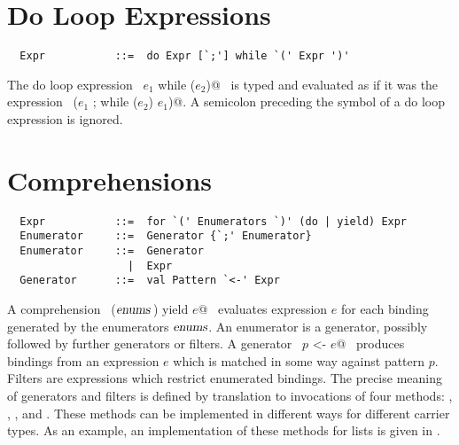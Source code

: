 \documentclass[a4paper,12pt,twoside,titlepage]{book}
\newcommand{\enums}{\mbox{\sl enums}}
\begin{document}
\section{Do Loop Expressions}

\syntax\begin{lstlisting}
  Expr           ::=  do Expr [`;'] while `(' Expr ')'
\end{lstlisting}

The do loop expression ~\lstinline@do $e_1$ while ($e_2$)@~ is typed and
evaluated as if it was the expression ~\lstinline@($e_1$ ; while ($e_2$) $e_1$)@.
A semicolon preceding the  symbol of a do loop expression is ignored.

\section{Comprehensions}

\syntax\begin{lstlisting}
  Expr           ::=  for `(' Enumerators `)' (do | yield) Expr
  Enumerator     ::=  Generator {`;' Enumerator}
  Enumerator     ::=  Generator
                   |  Expr
  Generator      ::=  val Pattern `<-' Expr
\end{lstlisting}

A comprehension ~\lstinline@for ($\enums\,$) yield $e$@~ evaluates expression $e$ for each
binding generated by the enumerators $\enums$. An enumerator is a generator,
possibly followed by further generators or filters.  A generator
~\lstinline@val $p$ <- $e$@~ produces bindings from an expression $e$ which is
matched in some way against pattern $p$. Filters are expressions which
restrict enumerated bindings. The precise meaning of generators and
filters is defined by translation to invocations of four methods:
, , , and . These
methods can be implemented in different ways for different carrier
types.  As an example, an implementation of these methods for lists is
given in .
\end{document}
